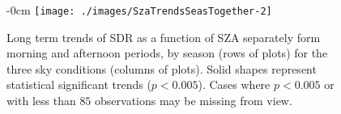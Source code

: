 \begin{figure}[h!]
    \begin{adjustwidth}{-\extralength}{0cm}
        {\centering
            \texttt{[image: ./images/SzaTrendsSeasTogether-2]}
        }
        \caption{Long term trends of SDR as a function of SZA separately form morning
               and afternoon periods, by season (rows of plots) for the three sky
               conditions (columns of plots).
               Solid shapes represent statistical significant trends ($p<0.005$).
               Cases where $p<0.005$ or with less than $85$ observations may be
               missing from view.}\label{fig:SZAtrendSeason}
    \end{adjustwidth}
\end{figure}




\FloatBarrier

%
